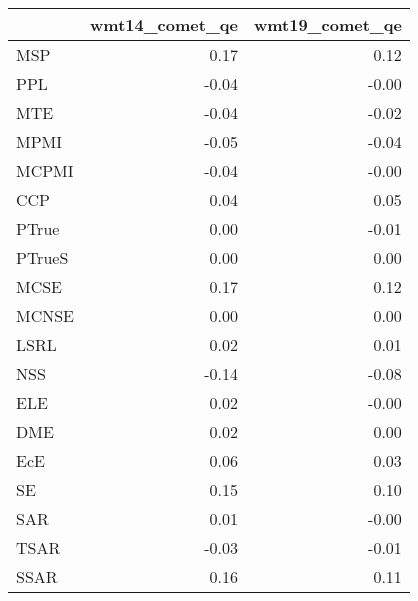 \begin{tabular}{lrr}
\toprule
 & wmt14\_comet\_qe & wmt19\_comet\_qe \\
\midrule
MSP & 0.17 & 0.12 \\
PPL & -0.04 & -0.00 \\
MTE & -0.04 & -0.02 \\
MPMI & -0.05 & -0.04 \\
MCPMI & -0.04 & -0.00 \\
CCP & 0.04 & 0.05 \\
PTrue & 0.00 & -0.01 \\
PTrueS & 0.00 & 0.00 \\
MCSE & 0.17 & 0.12 \\
MCNSE & 0.00 & 0.00 \\
LSRL & 0.02 & 0.01 \\
NSS & -0.14 & -0.08 \\
ELE & 0.02 & -0.00 \\
DME & 0.02 & 0.00 \\
EcE & 0.06 & 0.03 \\
SE & 0.15 & 0.10 \\
SAR & 0.01 & -0.00 \\
TSAR & -0.03 & -0.01 \\
SSAR & 0.16 & 0.11 \\
\bottomrule
\end{tabular}
